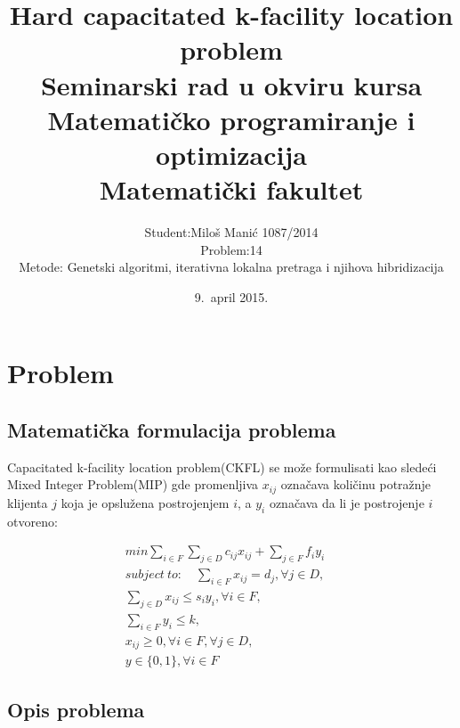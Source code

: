 \documentclass[a4paper]{article}
\begin{document}
\title{Hard capacitated k-facility location problem \\ \small{Seminarski rad u okviru kursa\\
Matematičko programiranje i optimizacija\\ Matematički fakultet}}

\author{
Student:Miloš Manić 1087/2014\\
Problem:14\\
Metode: Genetski algoritmi, iterativna lokalna pretraga i njihova hibridizacija}
\date{9.~april 2015.}
\maketitle

\abstract{


}


\tableofcontents

\newpage

\section{Problem}
\subsection{Matematička formulacija problema}
Capacitated k-facility location problem(CKFL) se može formulisati kao sledeći Mixed Integer Problem(MIP) gde promenljiva $x_{ij}$ označava količinu potražnje klijenta $j$ koja je opslužena postrojenjem $i$, a $y_i$ označava da li je postrojenje $i$ otvoreno:

\begin{align}
min \sum_{i \in F}\sum_{j \in D}c_{ij}x_{ij} + \sum_{j \in F}f_iy_i\\
 subject\: to: 
\quad \sum_{i \in F}x_{ij} = d_j, \forall j \in D,\quad\\
 \sum_{j \in D}x_{ij} \le s_iy_i, \forall i \in F,\\
\sum_{i \in F}y_i \le k,\\
x_{ij} \ge 0, \forall i \in F,\forall j \in D,\\
y \in \{ 0 , 1 \}, \forall i \in F
\end{align}
\subsection{Opis problema}
\end{document}
